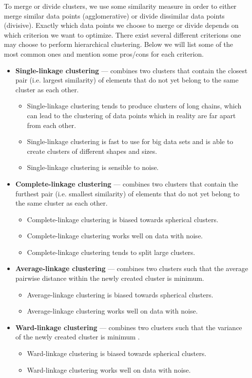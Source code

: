 To merge or divide clusters, we use some similarity measure in order to either merge similar data points (agglomerative) or divide dissimilar data points (divisive). Exactly which data points we choose to merge or divide depends on which criterion we want to optimize. There exist several different criterions one may choose to perform hierarchical clustering. Below we will list some of the most common ones and mention some pros/cons for each criterion.
\begin{itemize}
    \item \textbf{Single-linkage clustering} --- combines two clusters that contain the closest pair (i.e. largest similarity) of elements that do not yet belong to the same cluster as each other.
    \begin{itemize}
        \item Single-linkage clustering tends to produce clusters of long chains, which can lead to the clustering of data points which in reality are far apart from each other.
        \item Single-linkage clustering is fast to use for big data sets and is able to create clusters of different shapes and sizes.
        \item Single-linkage clustering is sensible to noise.
    \end{itemize}
    \item \textbf{Complete-linkage clustering}  --- combines two clusters that contain the furthest pair (i.e. smallest similarity) of elements that do not yet belong to the same cluster as each other.
    \begin{itemize}
        \item Complete-linkage clustering is biased towards spherical clusters.
        \item Complete-linkage clustering works well on data with noise.
        \item Complete-linkage clustering tends to split large clusters.
    \end{itemize}
    \item \textbf{Average-linkage clustering} --- combines two clusters such that the average pairwise distance within the newly created cluster is minimum.
    \begin{itemize}
        \item Average-linkage clustering is biased towards spherical clusters.
        \item Average-linkage clustering works well on data with noise.
    \end{itemize}
    \item \textbf{Ward-linkage clustering} --- combines two clusters such that the variance of the newly created cluster is minimum \cite{Ward1963}.
    \begin{itemize}
        \item Ward-linkage clustering is biased towards spherical clusters.
        \item Ward-linkage clustering works well on data with noise.
    \end{itemize}
\end{itemize}

